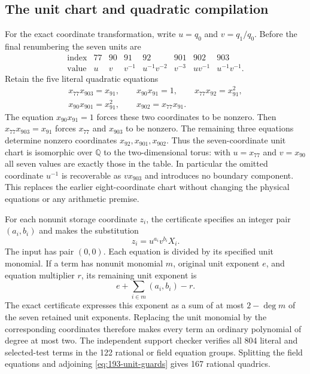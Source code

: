 \documentclass[11pt,a4paper]{article}
\begin{document}
\subsection{The unit chart and quadratic compilation}
For the exact coordinate transformation, write $u=q_0$ and
$v=q_1/q_0$. Before the final renumbering the seven units are
\[
\begin{array}{c|ccccccc}
\text{index}&77&90&91&92&901&902&903\\\hline
\text{value}&u&v&v^{-1}&u^{-1}v^{-2}&v^{-3}&uv^{-1}&u^{-1}v^{-1}.
\end{array}
\]
Retain the five literal quadratic equations
\begin{equation}\label{eq:193-unit-guards}
\begin{gathered}
 x_{77}x_{903}=x_{91},\qquad x_{90}x_{91}=1,\qquad
 x_{77}x_{92}=x_{91}^2,\\
 x_{90}x_{901}=x_{91}^2,\qquad
 x_{902}=x_{77}x_{91}.
\end{gathered}
\end{equation}
The equation $x_{90}x_{91}=1$ forces these two coordinates to be
nonzero. Then $x_{77}x_{903}=x_{91}$ forces $x_{77}$ and $x_{903}$
to be nonzero. The remaining three equations determine nonzero
coordinates $x_{92},x_{901},x_{902}$. Thus the seven-coordinate unit
chart is isomorphic over $\mathbb Q$ to the two-dimensional torus:
with $u=x_{77}$ and $v=x_{90}$ all seven values are exactly those
in the table. In particular the omitted coordinate $u^{-1}$ is
recoverable as $v x_{903}$ and introduces no boundary component.
This replaces the earlier eight-coordinate chart without changing
the physical equations or any arithmetic premise.

For each nonunit storage coordinate $z_i$, the certificate specifies an
integer pair $(a_i,b_i)$ and makes the substitution
\[
                         z_i=u^{a_i}v^{b_i}X_i.
\]
The input has pair $(0,0)$. Each equation is divided by its specified
unit monomial. If a term has nonunit monomial $m$, original unit
exponent $e$, and equation multiplier $r$, its remaining unit exponent is
\[
                    e+\sum_{i\in m}(a_i,b_i)-r.
\]
The exact certificate expresses this exponent as a sum of at most
$2-\deg m$ of the seven retained unit exponents. Replacing the unit
monomial by the corresponding coordinates therefore makes every term
an ordinary polynomial of degree at most two. The independent support
checker verifies all 804 literal and selected-test terms in the 122
rational or field equation groups. Splitting the field equations and
adjoining \eqref{eq:193-unit-guards} gives 167 rational quadrics.
\end{document}

